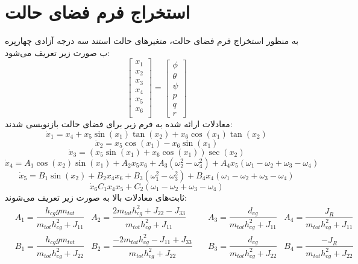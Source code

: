 \section{استخراج فرم فضای حالت}
به منظور استخراج فرم فضای حالت، متغیرهای حالت استند سه درجه آزادی چهارپره ب صورت زیر تعریف می‌شود:
\begin{equation}
	\begin{bmatrix}
		x_1\\x_2\\x_3\\x_4\\x_5\\x_6\\
	\end{bmatrix} = 
\begin{bmatrix}
	\phi\\ \theta \\ \psi \\ p\\ q\\ r
\end{bmatrix}
\end{equation}
معادلات ارائه شده به فرم زیر برای فضای حالت بازنویسی شدند:
\begin{equation}
	\dot x_1 = x_4 + x_5\sin(x_1)\tan(x_2) + x_6\cos(x_1)\tan(x_2)
\end{equation}
\begin{equation}
	\dot x_2 = x_5\cos(x_1)- x_6\sin(x_1)
\end{equation}
\begin{equation}
	\dot x_3 = (x_5\sin(x_1) + x_6\cos(x_1))\sec(x_2)
\end{equation}
\begin{equation}
	\dot x_4 = A_1\cos(x_2)\sin(x_1) + 
	A_2x_5x_6 + A_3\left(\omega_2^2-\omega_4^2\right)+
	A_4x_5\left(\omega_1-\omega_2+\omega_3-\omega_4\right)
\end{equation}
\begin{equation}
	\dot x_5 = B_1\sin(x_2) + 
	B_2x_4x_6 + B_3\left(\omega_1^2-\omega_3^2\right)+
	B_4x_4\left(\omega_1-\omega_2+\omega_3-\omega_4\right)
\end{equation}
\begin{equation}
	\dot x_6 C_1x_4x_5 + 
	C_2\left(\omega_1-\omega_2+\omega_3-\omega_4\right)
\end{equation}
ثابت‌های معادلات بالا  به صورت زیر تعریف می‌شوند:
\begin{align*}
	&A_1  = \dfrac{h_{cg}gm_{tot}}{m_{tot}h_{cg}^2+J_{11}}
	&A_2  = \dfrac{2m_{tot}h_{cg}^2+J_{22}-J_{33}}{m_{tot}h_{cg}^2+J_{11}}\quad
	&A_3  = \dfrac{d_{cg}}{m_{tot}h_{cg}^2+J_{11}}
	&A_4  = \dfrac{J_R}{m_{tot}h_{cg}^2+J_{11}}\\
	&B_1  = \dfrac{h_{cg}gm_{tot}}{m_{tot}h_{cg}^2+J_{22}}
	&B_2  = \dfrac{-2m_{tot}h_{cg}^2-J_{11}+J_{33}}{m_{tot}h_{cg}^2+J_{22}}\quad
	&B_3  = \dfrac{d_{cg}}{m_{tot}h_{cg}^2+J_{22}}
	&B_4  = \dfrac{-J_R}{m_{tot}h_{cg}^2+J_{22}}
\end{align*}
